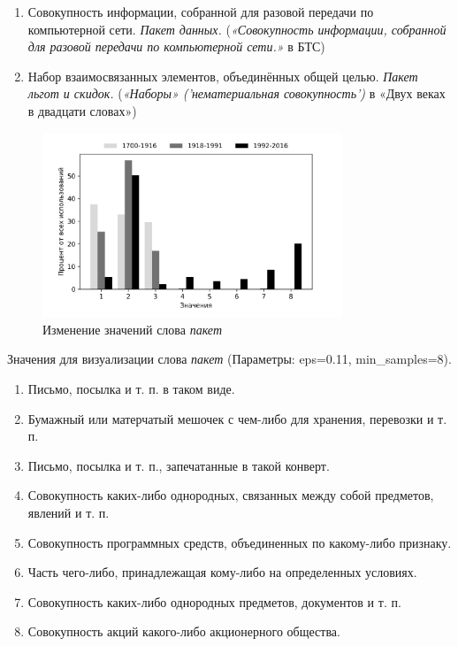 \documentclass[LI,VKR]{HSEUniversity}
\begin{document}
\begin{enumerate}
    \item Совокупность информации, собранной для разовой передачи по компьютерной сети. \textit{Пакет данных.}
(\textit{«Совокупность информации, собранной для разовой передачи по компьютерной сети.»} в БТС)

    \item Набор взаимосвязанных элементов, объединённых общей целью. \textit{Пакет льгот и скидок.}
(\textit{«Наборы» ('нематериальная совокупность')} в «Двух веках в двадцати словах»)
\end{enumerate}

\begin{figure}[H]
	\centering
	\includegraphics[width=0.8\textwidth]{img/visualizations/paket_minimal}
	\caption{Изменение значений слова \textit{пакет}}
	\label{fig:Пакет}
\end{figure}

Значения для визуализации слова \textit{пакет} (Параметры: eps=0.11, min\_samples=8).

\begin{enumerate}
    \item Письмо, посылка и т. п. в таком виде.
    \item Бумажный или матерчатый мешочек с чем-либо для хранения, перевозки и т. п.
    \item Письмо, посылка и т. п., запечатанные в такой конверт.
    \item Совокупность каких-либо однородных, связанных между собой предметов, явлений и т. п.
    \item Совокупность программных средств, объединенных по какому-либо признаку.
    \item Часть чего-либо, принадлежащая кому-либо на определенных условиях.
    \item Совокупность каких-либо однородных предметов, документов и т. п.
    \item Совокупность акций какого-либо акционерного общества.
\end{enumerate}
\end{document}
